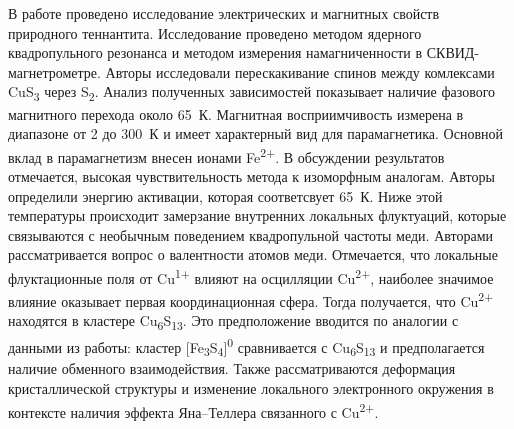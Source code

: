 В работе \cite{Gainov2008} проведено исследование электрических и магнитных свойств природного теннантита. Исследование проведено методом ядерного квадропульного резонанса и методом измерения намагниченности в СКВИД-магнетрометре. Авторы исследовали перескакивание спинов между комлексами CuS\textsubscript{3} через S\textsubscript{2}. Анализ полученных зависимостей показывает наличие фазового магнитного перехода около 65~К. Магнитная восприимчивость измерена в диапазоне от 2 до 300~К и имеет характерный вид для парамагнетика. Основной вклад в парамагнетизм внесен ионами Fe\textsuperscript{2+}. В обсуждении результатов отмечается, высокая чувствительность метода к изоморфным аналогам. Авторы определили энергию активации, которая соответсвует 65~К. Ниже этой температуры происходит замерзание внутренних локальных флуктуаций, которые связываются с необычным поведением квадропульной частоты меди. Авторами рассматривается вопрос о валентности атомов меди. Отмечается, что локальные флуктационные поля от Cu\textsuperscript{1+} влияют на осцилляции Cu\textsuperscript{2+}, наиболее значимое влияние оказывает первая координационная сфера. Тогда получается, что Cu\textsuperscript{2+} находятся в кластере Cu\textsubscript{6}S\textsubscript{13}. Это предположение вводится по аналогии с данными из работы\cite{Pattrick1993}: кластер [Fe\textsubscript{3}S\textsubscript{4}]\textsuperscript{0} сравнивается с Cu\textsubscript{6}S\textsubscript{13} и предполагается наличие обменного взаимодействия.  Также рассматриваются деформация кристаллической структуры и изменение локального электронного окружения в контексте наличия эффекта Яна--Теллера связанного с  Cu\textsuperscript{2+}.

